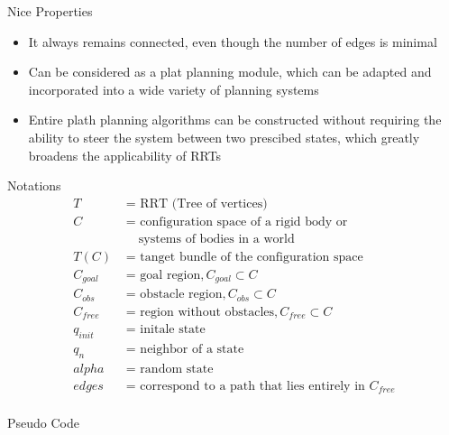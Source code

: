 \documentclass[%
  professionalfonts,%
  xcolor={%
    usenames,%
    dvipsnames,%
    svgnames,%
    table,%
    hyperref%
  }%
]{beamer}
\begin{document}
        \begin{frame}{Nice Properties}
          \begin{itemize}
            \item It always remains connected, even though the number of edges is minimal
            \item Can be considered as a plat planning module, which can be adapted and incorporated into a wide variety of planning systems
            \item Entire plath planning algorithms can be constructed without requiring the ability to steer the system between two prescibed states, which greatly broadens the applicability of RRTs
          \end{itemize}
        \end{frame}
        
        \begin{frame}{Notations}
          \begin{align*}
          T        & \text{ = RRT (Tree of vertices)}\\
          C        & \text{ = configuration space of a rigid body or}\\
                   & \text{ ~~ systems of bodies in a world}\\
          T(C)     & \text{ = tanget bundle of the configuration space}\\
          C_{goal} & \text{ = goal region},  C_{goal} \subset C\\
          C_{obs}  & \text{ = obstacle region},  C_{obs} \subset C\\
          C_{free} & \text{ = region without obstacles}, C_{free} \subset C\\
          q_{init} & \text{ = initale state}\\
          q_n      & \text{ = neighbor of a state}\\
          alpha    & \text{ = random state}\\
          edges    & \text{ = correspond to a path that lies entirely in } C_{free}\\
          \end{align*}
        \end{frame}
        
        \begin{frame}{Pseudo Code}
          
        \end{frame}
        
\end{document}
